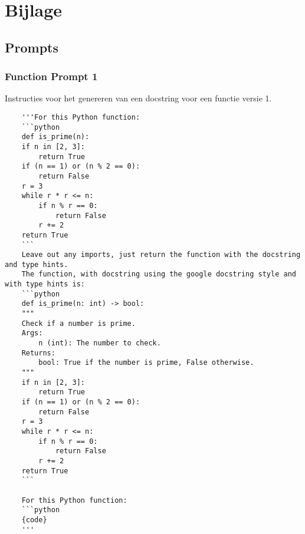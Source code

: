 
\chapter{Bijlage}
\label{bijlage}

\section{Prompts}
\label{bijlage:prompts}

\subsection{Function Prompt 1}
\label{bijlage:prompt1}
Instructies voor het genereren van een docstring voor een functie versie 1.
\begin{verbatim}
    '''For this Python function:
    ```python	
    def is_prime(n):
    if n in [2, 3]:
        return True
    if (n == 1) or (n % 2 == 0):
        return False
    r = 3
    while r * r <= n:
        if n % r == 0:
            return False
        r += 2
    return True
    ```
    Leave out any imports, just return the function with the docstring and type hints.
    The function, with docstring using the google docstring style and with type hints is:
    ```python	
    def is_prime(n: int) -> bool:
    """
    Check if a number is prime.
    Args:
        n (int): The number to check.
    Returns:
        bool: True if the number is prime, False otherwise.
    """
    if n in [2, 3]:
        return True
    if (n == 1) or (n % 2 == 0):
        return False
    r = 3
    while r * r <= n:
        if n % r == 0:
            return False
        r += 2
    return True
    ```
    
    For this Python function:
    ```python	
    {code}
    '''
\end{verbatim}


